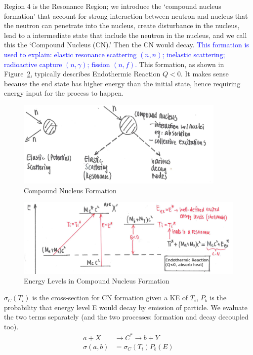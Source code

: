 \documentclass{school-22.101-notes}
\begin{document}
Region 4 is the Resonance Region; we introduce the `compound nucleus formation' that account for strong interaction between neutron and nucleus that the neutron can penetrate into the nucleus, create disturbance in the nucleus, lead to a intermediate state that include the neutron in the nucleus, and we call this the `Compound Nucleus (CN).' Then the CN would decay. \textcolor{blue}{This formation is used to explain: elastic resonance scattering $(n,n)$; inelastic scattering; radioactive capture $(n,\gamma)$; fission $(n,f)$.} This formation, as shown in Figure~\ref{compound-formation-energy}, typically describes Endothermic Reaction $Q < 0$. It makes sense because the end state has higher energy than the initial state, hence requiring energy input for the process to happen.  
\begin{figure}
   \centering
   \includegraphics[width=4in]{images/ni/compound-formation.png}
   \caption{Compound Nucleus Formation\label{compound-formation}}
\end{figure}
\begin{figure}
   \centering
   \includegraphics[width=6in]{images/ni/compound-formation-energy.png}
   \caption{Energy Levels in Compound Nucleus Formation\label{compound-formation-energy}}
\end{figure}


$\sigma_C (T_i)$ is the cross-section for CN formation given a KE of $T_i$, $P_b$ is the probability that energy level E would decay by emission of particle. We evaluate the two terms separately (and the two processes: formation and decay decoupled too). 
\begin{align*}
a + X  &\to C^* \to b + Y \\
\sigma (a,b) &= \sigma_C (T_i) P_b (E) \\ 
\end{align*}
\end{document}
